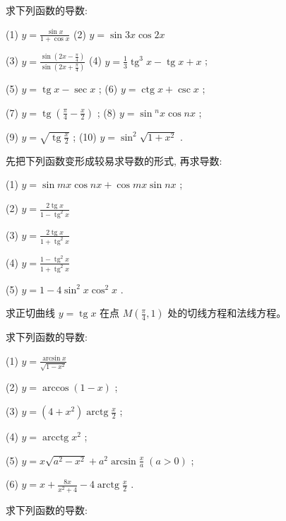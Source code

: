 \documentclass[lang=cn,newtx,12pt,scheme=chinese]{elegantbook}
\begin{document}
\begin{problemset}[习 题 六]

\item 求下列函数的导数:

(1) \(y = \frac{\sin x}{1 + \cos x}\) (2) \(y = \sin {3x}\cos {2x}\)

(3) \(y = \frac{\sin \left( {{2x} - \frac{\pi }{4}}\right) }{\sin \left( {{2x} + \frac{\pi }{4}}\right) }\) (4) \(y = \frac{1}{3}{\operatorname{tg}}^{3}x - \operatorname{tg}x + x\) ;

(5) \(y = \operatorname{tg}x - \sec x\) ; (6) \(y = \operatorname{ctg}x + \csc x\) ;

(7) \(y = \operatorname{tg}\left( {\frac{\pi }{4} - \frac{x}{2}}\right)\) ; (8) \(y = \sin {}^{n}x\cos {nx}\) ;

(9) \(y = \sqrt{\operatorname{tg}\frac{x}{2}}\) ; (10) \(y = {\sin }^{2}\sqrt{1 + {x}^{2}}\) .

\item 先把下列函数变形成较易求导数的形式, 再求导数:

(1) \(y = \sin {mx}\cos {nx} + \cos {mx}\sin {nx}\) ;

(2) \(y = \frac{2\operatorname{tg}x}{1 - {\operatorname{tg}}^{2}x}\)

(3) \(y = \frac{2\operatorname{tg}x}{1 + {\operatorname{tg}}^{2}x}\)

(4) \(y = \frac{1 - {\operatorname{tg}}^{2}x}{1 + {\operatorname{tg}}^{2}x}\)

(5) \(y = 1 - 4{\sin }^{2}x{\cos }^{2}x\) .

\item 求正切曲线 \(y = \operatorname{tg}x\) 在点 \(M\left( {\frac{\pi }{4},1}\right)\) 处的切线方程和法线方程。

\item 求下列函数的导数:

(1) \(y = \frac{\arcsin x}{\sqrt{1 - {x}^{2}}}\)

(2) \(y = \arccos \left( {1 - x}\right)\) ;

(3) \(y = \left( {4 + {x}^{2}}\right) \operatorname{arctg}\frac{x}{2}\) ;

(4) \(y = \operatorname{arcctg}{x}^{2}\) ;

(5) \(y = x\sqrt{{a}^{2} - {x}^{2}} + {a}^{2}\arcsin \frac{x}{a}\;\left( {a > 0}\right)\) ;

(6) \(y = x + \frac{8x}{{x}^{2} + 4} - 4\operatorname{arctg}\frac{x}{2}\) .

\item 求下列函数的导数:


\end{problemset}
\end{document}
